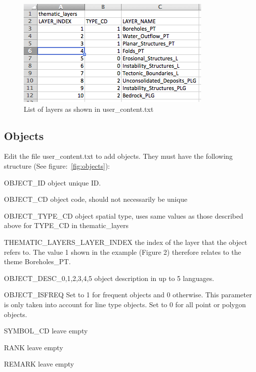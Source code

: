 \documentclass[a4paper, 12pt]{article}
\begin{document}
\begin{figure} [hbp]
	\centering
    \includegraphics[width=.6\textwidth]{img/layers.png}
    \caption{List of layers as shown in user\_content.txt}
    \label{fig:layers}
\end{figure}

\subsection{Objects}

Edit the file user\_content.txt to add objects. They must have the following structure (See figure:~\ref{fig:objects}):
\begin{description*}
  \item [OBJECT\_ID] object unique ID.
  \item [OBJECT\_CD] object code, should not necessarily be unique
  \item [OBJECT\_TYPE\_CD] object spatial type, uses same values as those described above for TYPE\_CD in thematic\_layers
  \item [THEMATIC\_LAYERS\_LAYER\_INDEX] the index of the layer that the object refers to. The value 1 shown in the example (Figure 2) therefore relates to the theme Boreholes\_PT.
  \item [OBJECT\_DESC\_0,1,2,3,4,5] object description in up to 5 languages.
  \item [OBJECT\_ISFREQ] Set to 1 for frequent objects and 0 otherwise. This parameter is only taken into account for line type objects. Set to 0 for all point or polygon objects.
  \item [SYMBOL\_CD] leave empty
  \item [RANK] leave empty
  \item [REMARK] leave empty
\end{description*}
\end{document}

